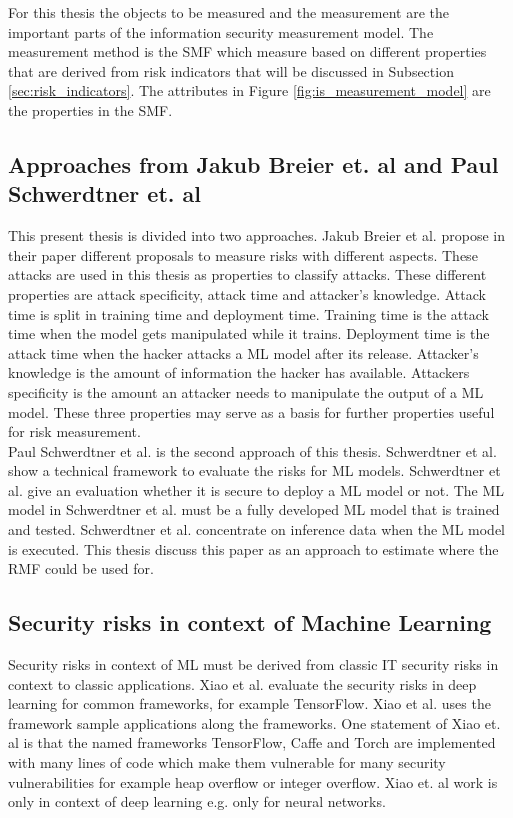 For this thesis the objects to be measured and the measurement are the important parts of the information security measurement model. The measurement method is the SMF which measure based on different properties that are derived from risk indicators that will be discussed in Subsection \ref{sec:risk_indicators}. The attributes in Figure \ref{fig:is_measurement_model} are the properties in the SMF.

\subsection{Approaches from Jakub Breier et. al and Paul Schwerdtner et. al}

This present thesis is divided into two approaches. Jakub Breier et al. \cite{DBLP:journals/corr/abs-2012-04884} propose in their paper different proposals to measure risks with different aspects.
These attacks are used in this thesis as properties to classify attacks. These different properties are attack specificity, attack time and attacker's knowledge. Attack time is split in training time
and deployment time. Training time is the attack time when the model gets manipulated while it trains. Deployment time is the attack time when the hacker attacks a ML model after its release.
Attacker's knowledge is the amount of information the hacker has available. Attackers specificity is the amount an attacker needs to manipulate the output of a ML model. These three properties may
serve as a basis for further properties useful for risk measurement. \\
Paul Schwerdtner et al. \cite{DBLP:journals/corr/abs-2011-04328} is the second approach of this thesis. Schwerdtner et al. show a technical framework to evaluate the risks for ML models. Schwerdtner et
al. give an evaluation whether it is secure to deploy a ML model or not. The ML model in Schwerdtner et al. must be a fully developed ML model that is trained and tested. Schwerdtner et al. concentrate
on inference data when the ML model is executed. This thesis discuss this paper as an approach to estimate where the RMF could be used for.

\subsection{Security risks in context of Machine Learning}

Security risks in context of ML must be derived from classic IT security risks in context to classic applications.
Xiao et al. \cite{DBLP:conf/sp/XiaoLZX18} evaluate the security risks in deep learning for common frameworks, for example TensorFlow. Xiao et al. uses the framework sample applications along the
frameworks. One statement of Xiao et. al is that the named frameworks TensorFlow, Caffe and Torch are implemented with many lines of code which make them vulnerable for many security vulnerabilities
for example heap overflow or integer overflow. Xiao et. al work is only in context of deep learning e.g. only for neural networks.

